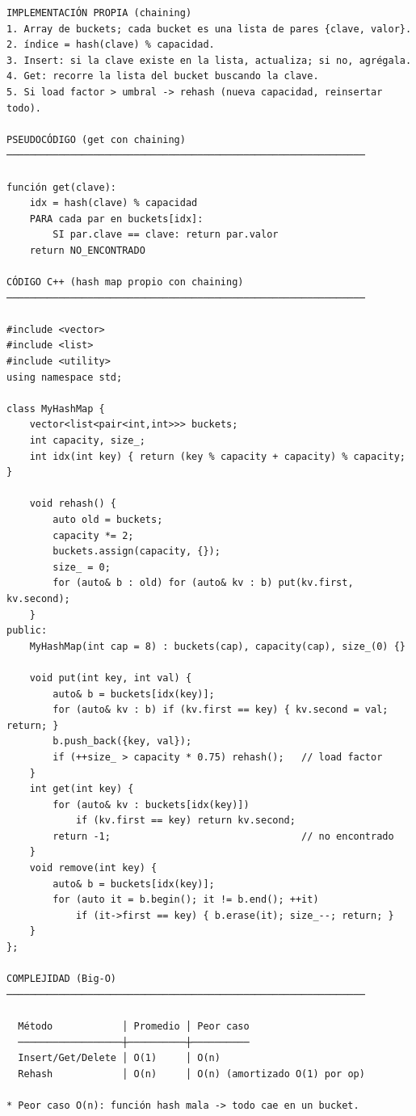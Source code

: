 \begin{lstlisting}
IMPLEMENTACIÓN PROPIA (chaining)
1. Array de buckets; cada bucket es una lista de pares {clave, valor}.
2. índice = hash(clave) % capacidad.
3. Insert: si la clave existe en la lista, actualiza; si no, agrégala.
4. Get: recorre la lista del bucket buscando la clave.
5. Si load factor > umbral -> rehash (nueva capacidad, reinsertar todo).

PSEUDOCÓDIGO (get con chaining)
──────────────────────────────────────────────────────────────

función get(clave):
    idx = hash(clave) % capacidad
    PARA cada par en buckets[idx]:
        SI par.clave == clave: return par.valor
    return NO_ENCONTRADO

CÓDIGO C++ (hash map propio con chaining)
──────────────────────────────────────────────────────────────

#include <vector>
#include <list>
#include <utility>
using namespace std;

class MyHashMap {
    vector<list<pair<int,int>>> buckets;
    int capacity, size_;
    int idx(int key) { return (key % capacity + capacity) % capacity; }

    void rehash() {
        auto old = buckets;
        capacity *= 2;
        buckets.assign(capacity, {});
        size_ = 0;
        for (auto& b : old) for (auto& kv : b) put(kv.first, kv.second);
    }
public:
    MyHashMap(int cap = 8) : buckets(cap), capacity(cap), size_(0) {}

    void put(int key, int val) {
        auto& b = buckets[idx(key)];
        for (auto& kv : b) if (kv.first == key) { kv.second = val; return; }
        b.push_back({key, val});
        if (++size_ > capacity * 0.75) rehash();   // load factor
    }
    int get(int key) {
        for (auto& kv : buckets[idx(key)])
            if (kv.first == key) return kv.second;
        return -1;                                 // no encontrado
    }
    void remove(int key) {
        auto& b = buckets[idx(key)];
        for (auto it = b.begin(); it != b.end(); ++it)
            if (it->first == key) { b.erase(it); size_--; return; }
    }
};

COMPLEJIDAD (Big-O)
──────────────────────────────────────────────────────────────

  Método            │ Promedio │ Peor caso
  ──────────────────┼──────────┼──────────
  Insert/Get/Delete │ O(1)     │ O(n)
  Rehash            │ O(n)     │ O(n) (amortizado O(1) por op)

* Peor caso O(n): función hash mala -> todo cae en un bucket.
\end{lstlisting}

